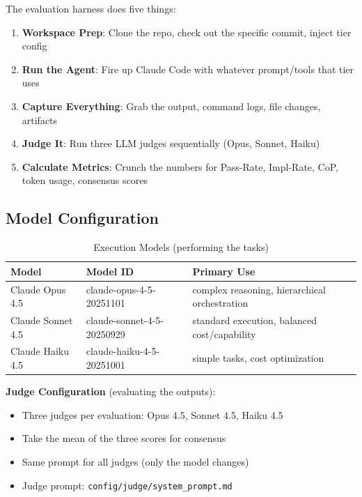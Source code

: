 \documentclass[11pt]{article}
\begin{document}
The evaluation harness does five things:

\begin{enumerate}
\item \textbf{Workspace Prep}: Clone the repo, check out the specific commit, inject tier config
\item \textbf{Run the Agent}: Fire up Claude Code with whatever prompt/tools that tier uses
\item \textbf{Capture Everything}: Grab the output, command logs, file changes, artifacts
\item \textbf{Judge It}: Run three LLM judges sequentially (Opus, Sonnet, Haiku)
\item \textbf{Calculate Metrics}: Crunch the numbers for Pass-Rate, Impl-Rate, CoP, token usage, consensus scores
\end{enumerate}

\subsection{Model Configuration}

\begin{table}[htbp]
\centering
\caption{Execution Models (performing the tasks)}
\begin{tabular}{lll}
\toprule
Model & Model ID & Primary Use \\
\midrule
Claude Opus 4.5 & claude-opus-4-5-20251101 & complex reasoning, hierarchical orchestration \\
Claude Sonnet 4.5 & claude-sonnet-4-5-20250929 & standard execution, balanced cost/capability \\
Claude Haiku 4.5 & claude-haiku-4-5-20251001 & simple tasks, cost optimization \\
\bottomrule
\end{tabular}
\end{table}


\textbf{Judge Configuration} (evaluating the outputs):

\begin{itemize}
\item Three judges per evaluation: Opus 4.5, Sonnet 4.5, Haiku 4.5
\item Take the mean of the three scores for consensus
\item Same prompt for all judges (only the model changes)
\item Judge prompt: \texttt{config/judge/system\_prompt.md}
\end{itemize}
\end{document}
